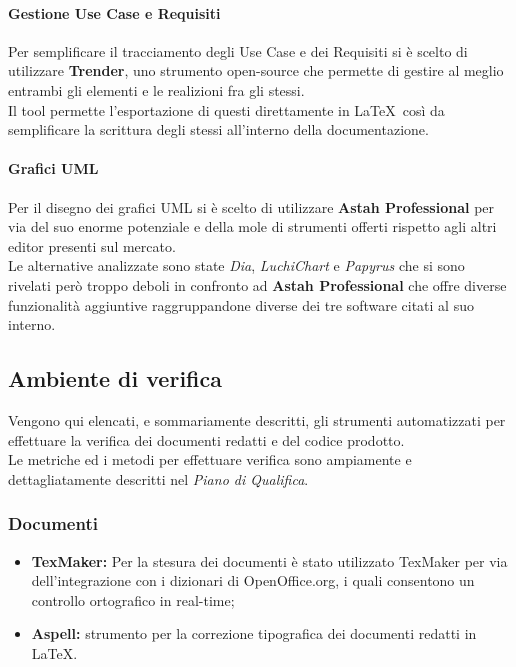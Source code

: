       \paragraph{Gestione Use Case e Requisiti}
        Per semplificare il tracciamento degli Use Case e dei Requisiti si è scelto di utilizzare \textbf{Trender}, uno strumento open-source che permette
        di gestire al meglio entrambi gli elementi e le realizioni fra gli stessi.\\
        Il tool permette l'esportazione di questi direttamente in \LaTeX\, così da semplificare la scrittura degli stessi all'interno della documentazione.
    \paragraph{Grafici UML}
      Per il disegno dei grafici UML si è scelto di utilizzare \textbf{Astah Professional} per via del suo enorme potenziale e della mole di strumenti offerti
      rispetto agli altri editor presenti sul mercato.\\
      Le alternative analizzate sono state \emph{Dia}, \emph{LuchiChart} e \emph{Papyrus} che si sono rivelati però troppo deboli in confronto ad \textbf{Astah Professional} che offre
      diverse funzionalità aggiuntive raggruppandone diverse dei tre software citati al suo interno.
  \subsection{Ambiente di verifica}
    Vengono qui elencati, e sommariamente descritti, gli strumenti automatizzati per effettuare la verifica dei documenti redatti e del codice prodotto.\\
    Le metriche ed i metodi per effettuare verifica sono ampiamente e dettagliatamente descritti nel \emph{Piano di Qualifica}.\\
    \subsubsection{Documenti}
      \begin{itemize}
        \item \textbf{TexMaker: }Per la stesura dei documenti è stato utilizzato TexMaker per via dell'integrazione con i dizionari di OpenOffice.org, i quali consentono un controllo ortografico in real-time;
        \item \textbf{Aspell: }strumento per la correzione tipografica dei documenti redatti in \LaTeX.
      \end{itemize}
